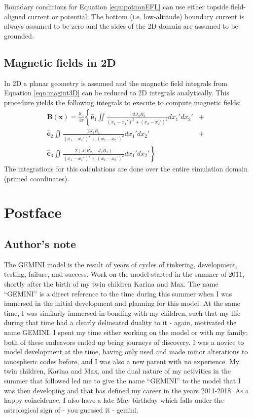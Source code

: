 \documentclass[11pt,letterpaper]{article}
\begin{document}
Boundary conditions for Equation \ref{eqn:potnonEFL} can use either topside field-aligned current or potential.  The bottom (i.e. low-altitude) boundary current is always assumed to be zero and the sides of the 2D domain are assumed to be grounded. 
 

\subsection{Magnetic fields in 2D}

In 2D a planar geometry is assumed and the magnetic field integrals from Equation \ref{eqn:magint3D} can be reduced to 2D integrals analytically.  This procedure yields the following integrals to execute to compute magnetic fields:
\begin{eqnarray}
\mathbf{B}(\mathbf{x}) = \frac{\mu_0}{4 \pi} \left\{  \hat{\mathbf{e}}_1 \iint \frac{-2 J_3 R_2}{(x_1-x_1')^2+(x_2-x_2')^2} d x_1' d x_2' \right. &+& \nonumber \\
\hat{\mathbf{e}}_2 \iint \frac{2 J_3 R_1}{(x_1-x_1')^2+(x_2-x_2')^2} d x_1' d x_2' &+& \nonumber \\
 \left. \hat{\mathbf{e}}_3 \iint \frac{2 \left( J_1 R_2 - J_2 R_1 \right) }{(x_1-x_1')^2+(x_2-x_2')^2} d x_1' d x_2' \right\} \label{eqn:magint2D}
\end{eqnarray}
The integrations for this calculations are done over the entire simulation domain (primed coordinates).  


\section{Postface}

\subsection{Author's note}

The GEMINI model is the result of years of cycles of tinkering, development, testing, failure, and success.  Work on the model started in the summer of 2011, shortly after the birth of my twin children Karina and Max.  The name ``GEMINI'' is a direct reference to the time during this summer when I was immersed in the initial development and planning for this model.  At the same time, I was similarly immersed in bonding with my children, such that my life during that time had a clearly delineated duality to it - again, motivated the name GEMINI.  I spent my time either working on the model or with my family; both of these endeavors ended up being journeys of discovery.  I was a novice to model development at the time, having only used and made minor alterations to ionospheric codes before, and I was also a new parent with no experience.  My twin children, Karina and Max, and the dual nature of my activities in the summer that followed led me to give the name ``GEMINI'' to the model that I was then developing and that has defined my career in the years 2011-2018.  As a happy coincidence, I also have a late May birthday which falls under the astrological sign of - you guessed it - gemini.  
\end{document}
